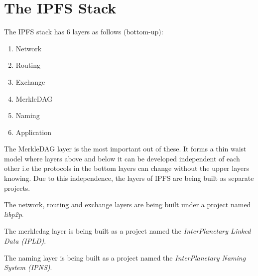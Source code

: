 
\chapter{The IPFS Stack}
The IPFS stack has 6 layers as follows (bottom-up):

\begin{enumerate}
    \item Network
    \item Routing
    \item Exchange
    \item MerkleDAG
    \item Naming
    \item Application
\end{enumerate}

The MerkleDAG layer is the most important out of these. It forms a thin waist model where layers above and below it can be developed independent of each other i.e the protocols in the bottom layers can change without the upper layers knowing. Due to this independence, the layers of IPFS are being built as separate projects.

The network, routing and exchange layers are being built under a project named \textit{libp2p}\cite{libp2p}.

The merkledag layer is being built as a project named the \textit{InterPlanetary Linked Data (IPLD)}\cite{ipld}.

The naming layer is being built as a project named the \textit{InterPlanetary Naming System (IPNS)}.







